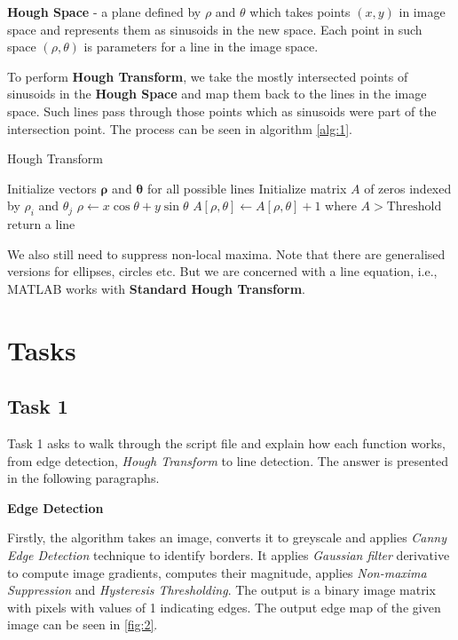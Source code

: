 \documentclass[lettersize,journal]{IEEEtran}
\begin{document}
\hfill

\noindent\textbf{Hough Space} - a plane defined by $\rho$ and $\theta$ which takes points $(x, y)$ in image space and represents them as sinusoids in the new space. Each point in such space $(\rho, \theta)$ is parameters for a line in the image space.

\hfill

To perform \textbf{Hough Transform}, we take the mostly intersected points of sinusoids in the \textbf{Hough Space} and map them back to the lines in the image space. Such lines pass through those points which as sinusoids were part of the intersection point. The process can be seen in algorithm \ref{alg:1}.

\begin{algorithm}
    \caption{Hough Transform}\label{alg:1}
    \begin{algorithmic}
        \State Initialize vectors $\boldsymbol{\rho}$ and $\boldsymbol{\theta}$ for all possible lines
        \State Initialize matrix $A$ of zeros indexed by $\rho_i$ and $\theta_j$
                \State $\rho \gets x \cos \theta + y \sin \theta$
                \State $A[\rho, \theta] \gets A[\rho, \theta] + 1$
            \EndFor
        \EndFor
        \State where $A > \text{Threshold}$ return a line
    \end{algorithmic}
\end{algorithm}

We also still need to suppress non-local maxima. Note that there are generalised versions for ellipses, circles etc. But we are concerned with a line equation, i.e., MATLAB works with \textbf{Standard Hough Transform}.

\section{Tasks}\label{section:4}
\subsection{Task 1}

\noindent Task 1 asks to walk through the script file and explain how each function works, from edge detection, \emph{Hough Transform} to line detection. The answer is presented in the following paragraphs.

\hfill

\noindent\textbf{Edge Detection}

Firstly, the algorithm takes an image, converts it to greyscale and applies \emph{Canny Edge Detection} technique to identify borders. It applies \emph{Gaussian filter} derivative to compute image gradients, computes their magnitude, applies \emph{Non-maxima Suppression} and \emph{Hysteresis Thresholding}. The output is a binary image matrix with pixels with values of 1 indicating edges. The output edge map of the given image can be seen in \autoref{fig:2}.
\end{document}
